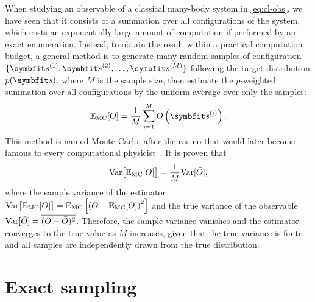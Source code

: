 When studying an observable of a classical many-body system in \cref{eq:cl-obs}, we have seen that it consists of a summation over all configurations of the system, which costs an exponentially large amount of computation if performed by an exact enumeration. Instead, to obtain the result within a practical computation budget, a general method is to generate many random samples of configuration $\{\vs^{(1)}, \vs^{(2)}, \ldots, \vs^{(M)}\}$ following the target distribution $p(\vs)$, where $M$ is the sample size, then estimate the $p$-weighted summation over all configurations by the uniform average over only the samples:
\begin{equation}
\bbE_\text{MC}[O] = \frac{1}{M} \sum_{i = 1}^M O\left( \vs^{(i)} \right).
\label{eq:monte-carlo}
\end{equation}
This method is named Monte Carlo, after the casino that would later become famous to every computational physicist~\cite{metropolis1949monte, landau2021guide1}. It is proven that~\cite{feller1968extention}
\begin{equation}
\mathrm{Var}\big[ \mathbb{E}_\text{MC}[O] \big] = \frac{1}{M} \mathrm{Var}[\bar{O}],
\label{eq:monte-carlo-var}
\end{equation}
where the sample variance of the estimator $\mathrm{Var}\big[ \mathbb{E}_\text{MC}[O] \big] = \mathbb{E}_\text{MC}\left[ \left( O - \mathbb{E}_\text{MC}[O] \right)^2 \right]$ and the true variance of the observable $\mathrm{Var}[\bar{O}] = \overline{(O - \bar{O})^2}$. Therefore, the sample variance vanishes and the estimator converges to the true value as $M$ increases, given that the true variance is finite and all samples are independently drawn from the true distribution.

\section{Exact sampling}

